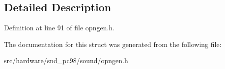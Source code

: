 \subsection{Detailed Description}


Definition at line 91 of file opngen.\-h.



The documentation for this struct was generated from the following file\-:\begin{DoxyCompactItemize}
\item 
src/hardware/snd\-\_\-pc98/sound/opngen.\-h\end{DoxyCompactItemize}
